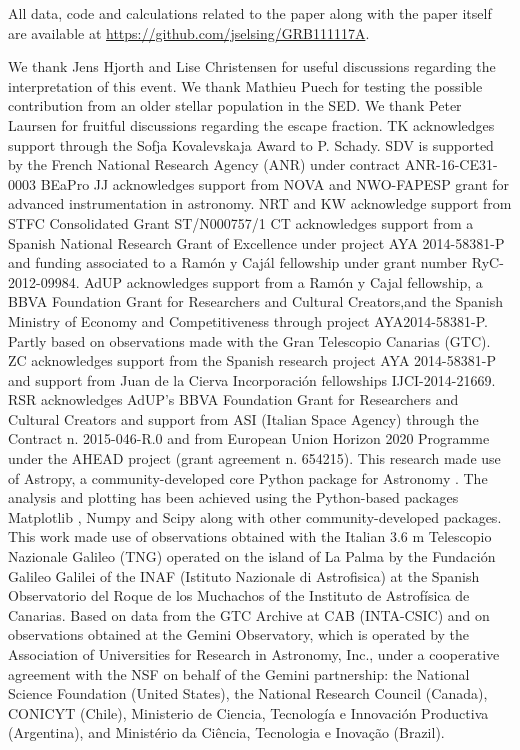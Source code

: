 \documentclass{aa}    %
\begin{document}
All data, code and calculations related to the paper along with the
paper itself are available at \url{https://github.com/jselsing/GRB111117A}.

\begin{acknowledgements}
We thank Jens Hjorth and Lise Christensen for useful discussions regarding the interpretation of this event. We thank Mathieu Puech for testing the possible contribution from an older stellar population in the SED. We thank Peter Laursen for fruitful discussions regarding the \lya escape fraction.
%	
TK acknowledges support through the Sofja Kovalevskaja Award to P. Schady.
%
SDV is supported by the French National Research Agency (ANR) under contract ANR-16-CE31-0003 BEaPro 
%
JJ acknowledges support from NOVA and NWO-FAPESP grant for advanced
instrumentation in astronomy.
%
NRT and KW acknowledge support from STFC Consolidated
Grant ST/N000757/1
%
CT acknowledges support from a Spanish National Research Grant of Excellence
under project AYA 2014-58381-P and funding associated to a Ramón y Cajál
fellowship under grant number RyC-2012-09984.
%
AdUP acknowledges support from a Ramón y Cajal fellowship, a BBVA Foundation
Grant for Researchers and Cultural Creators,and the Spanish Ministry of Economy
and Competitiveness through project AYA2014-58381-P. Partly based on
observations made with the Gran Telescopio Canarias (GTC).
%
ZC acknowledges support from the Spanish research project AYA 2014-58381-P and
support from Juan de la Cierva Incorporaci\'on fellowships IJCI-2014-21669.
%
RSR acknowledges AdUP's BBVA Foundation Grant for Researchers and Cultural
Creators and support from ASI (Italian Space Agency) through the Contract n. 2015-046-R.0 and from European Union Horizon 2020 Programme under the AHEAD project (grant agreement n. 654215).
%
This research made use of Astropy, a community-developed core Python package for Astronomy \citep{TheAstropyCollaboration2013}. The analysis and plotting has been achieved using the Python-based packages Matplotlib \citep{Hunter2007}, Numpy and Scipy \citep{VanderWalt2011} along with other community-developed packages.
%
This work made use of observations obtained with the Italian 3.6 m Telescopio Nazionale Galileo (TNG) operated on the island of La Palma by the Fundaci\'on Galileo Galilei of the INAF (Istituto Nazionale di Astrofisica) at the Spanish Observatorio del Roque de los Muchachos of the Instituto de Astrof\'isica de Canarias.
%
Based on data from the GTC Archive at CAB (INTA-CSIC) and on observations obtained at the Gemini Observatory, which is operated by the Association of Universities for Research in Astronomy, Inc., under a cooperative agreement with the NSF on behalf of the Gemini partnership: the National Science Foundation (United States), the National Research Council (Canada), CONICYT (Chile), Ministerio de Ciencia, Tecnología e Innovación Productiva (Argentina), and Ministério da Ciência, Tecnologia e Inovação (Brazil).

\end{acknowledgements}



\end{document}
